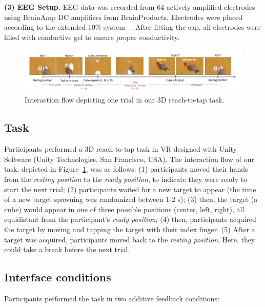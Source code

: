 
\textbf{(3) EEG Setup.} EEG data was recorded from 64 actively amplified electrodes using BrainAmp DC amplifiers from BrainProducts. Electrodes were placed according to the extended 10\% system ~\cite{Chatrian1985-ys}. After fitting the cap, all electrodes were filled with conductive gel to ensure proper conductivity.

\begin{figure}[!ht]
\includegraphics[width=\linewidth]{figures/Task_mismatch.jpg}
\vspace{-15pt}
\caption{Interaction flow depicting one trial in our 3D reach-to-tap task.}
\label{task_flow}
\end{figure}

\subsection{Task}
Participants performed a 3D reach-to-tap task in VR designed with Unity Software (Unity Technologies, San Francisco, USA). The interaction flow of our task, depicted in Figure~\ref{task_flow}, was as follows: (1) participants moved their hands from the \textit{resting position} to the \textit{ready position}, to indicate they were ready to start the next trial; (2) participants waited for a new target to appear (the time of a new target spawning was randomized between 1-2 s); (3) then, the target (a cube) would appear in one of three possible positions (center, left, right), all equidistant from the participant's \textit{ready position}; (4) then, participants acquired the target by moving and tapping the target with their index finger. (5) After a target was acquired, participants moved back to the \textit{resting position}. Here, they could take a break before the next trial.

\subsection{Interface conditions}
Participants performed the task in two additive feedback conditions:

